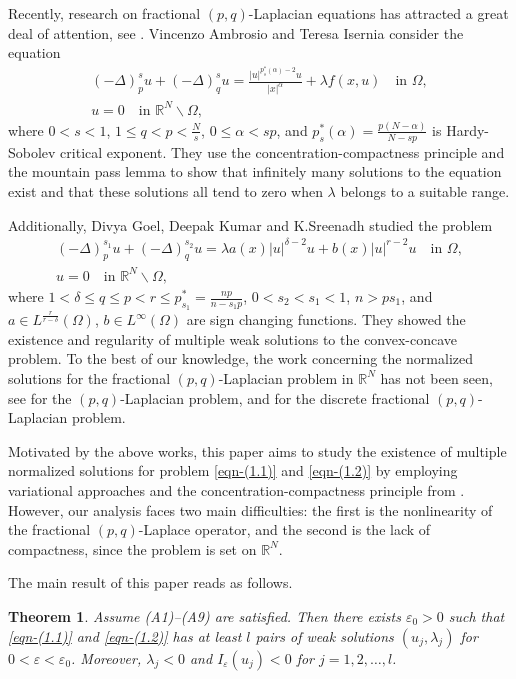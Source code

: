 \documentclass[10pt,a4paper]{amsart}
\numberwithin{equation}{section}
\newtheorem{theorem}{Theorem}[section]
\begin{document}
Recently, research on fractional $(p,q)$-Laplacian equations has attracted a great deal of
attention, see \cite{ref9, ref30, ref37}. Vincenzo Ambrosio and Teresa Isernia \cite{ref2} consider the equation
\begin{gather*}
(-\Delta)_p^{s}u+(-\Delta)_q^{s}u=\frac{|u|^{p_s^{*}(\alpha)-2}u}{|x|^{\alpha}}+\lambda f(x,u)\quad\text{in }\Omega,\\
u=0\quad\text{in }\mathbb{R}^N\backslash\Omega,
\end{gather*}
where $0<s<1$, $1\le q<p<\frac{N}{s}$, $0\le\alpha<sp$, and
$p_s^{*}(\alpha)=\frac{p(N-\alpha)}{N-sp}$ is Hardy-Sobolev critical exponent.
They use the concentration-compactness principle and the mountain pass lemma to show
that infinitely many solutions to the equation exist and that these solutions all tend to zero
when $\lambda$ belongs to a suitable range.

Additionally, Divya Goel, Deepak Kumar and K.Sreenadh \cite{ref16} studied the problem
\begin{gather*}
(-\Delta)_p^{s_1} u+(-\Delta)_q^{s_2} u=\lambda a(x)|u|^{\delta-2}u+ b(x) |u|^{r-2}u\quad\text{in }\Omega,\\
u=0 \quad\text{in }\mathbb{R}^N\backslash\Omega,
\end{gather*}
where $1<\delta\le q\le p<r\le p_{s_1}^{*}=\frac{np}{n-s_1p}$, $0<s_2<s_1<1$, $n>ps_1$,
and $a\in L^{\frac{r}{r-\delta}}(\Omega)$, $b\in L^{\infty}(\Omega)$ are sign changing
functions. They showed the existence and regularity of multiple weak solutions to the
convex-concave problem. To the best of our knowledge, the work concerning the
normalized solutions for the fractional $(p,q)$-Laplacian problem in $\mathbb{R}^N$ has not
been seen, see \cite{n3} for the $(p,q)$-Laplacian problem, and \cite{ref33} for the discrete fractional $(p,q)$-Laplacian problem.

Motivated by the above works, this paper aims to study the existence of multiple normalized
solutions for problem \eqref{eqn-(1.1)} and \eqref{eqn-(1.2)} by employing variational
approaches and  the concentration-compactness principle from \cite{ref1, ref13}.
However, our analysis faces two main difficulties: the first is the nonlinearity of the 
fractional $(p,q)$-Laplace operator, and the second is the lack of compactness,
since the problem  is set on $\mathbb{R}^N$.

 The main result of this paper reads as follows.


\begin{theorem}\label{theorem:1.1}
Assume {\rm (A1)--(A9)} are satisfied.
 Then there exists $\varepsilon_0>0$ such that  \eqref{eqn-(1.1)} and \eqref{eqn-(1.2)}
 has at least $l$ pairs of weak solutions $(u_j,\lambda_j)$ for $0<\varepsilon<\varepsilon_0$. Moreover, $\lambda_j<0$ and $I_{\varepsilon}(u_j)<0$ for $j=1,2,\dots,l$.
\end{theorem}
\end{document}
